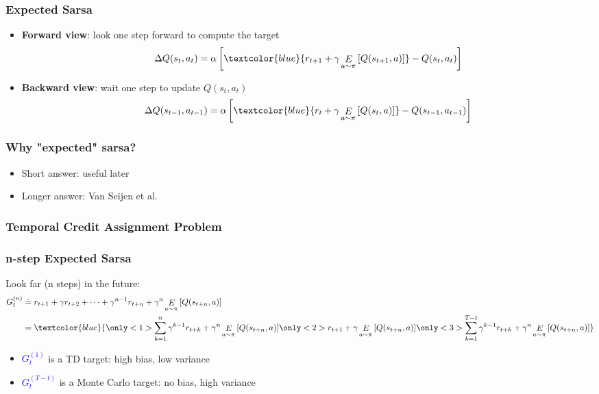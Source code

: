 \documentclass{beamer}
\newcommand{\expect}[2]{\mathop{E}_{#1}\left[#2\right]}
\begin{document}
\begin{frame}
\frametitle{Expected Sarsa}
\begin{itemize}
\item<1-> \textbf{Forward view}: look one step forward to compute the target
\[
	\Delta Q(s_t,a_t) = \alpha\left[\textcolor{blue}{r_{t+1} + \gamma\expect{a\sim\pi}{Q(s_{t+1},a)}} - Q(s_t,a_t)\right]
\]
\item<2> \textbf{Backward view}: wait one step to update $Q(s_t,a_t)$
\begin{align*}
	\Delta Q(s_{t-1},a_{t-1}) = \alpha\left[
	\textcolor{blue}{r_t + \gamma\expect{a\sim\pi}{Q(s_t,a)}} - Q(s_{t-1},a_{t-1})\right] 
\end{align*}
\end{itemize}
\end{frame}

\begin{frame}
\frametitle{Why "expected" sarsa?}
\begin{itemize}
\item Short answer: useful later
\item Longer answer: Van Seijen et al. \cite{van2009theoretical}
\end{itemize}
\end{frame}

\begin{frame}
\frametitle{Temporal Credit Assignment Problem}
\end{frame}

\begin{frame}
\frametitle{n-step Expected Sarsa}
Look far (n steps) in the future:
\begin{align*}
	G_t^{(n)} &\doteq r_{t+1} + \gamma r_{t+2} + \dots + \gamma^{n-1}r_{t+n}
		+ \gamma^n\expect{a\sim\pi}{Q(s_{t+n},a)} \\
		& = \textcolor{blue}{
		\only<1>{
		\sum_{k=1}^{n}\gamma^{k-1}r_{t+k} + \gamma^n\expect{a\sim\pi}{Q(s_{t+n},a)}
		}\only<2>{
		r_{t+1}+\gamma\expect{a\sim\pi}{Q(s_{t+n},a)}
		}\only<3>{
		\sum_{k=1}^{T-t}\gamma^{k-1}r_{t+k} + \gamma^n\expect{a\sim\pi}{Q(s_{t+n},a)}}
		}
\end{align*}
\begin{itemize}
\item<2,4> \textcolor{blue}{$G_t^{(1)}$} is a TD target: high bias, low variance
\item<3-> \textcolor{blue}{$G_t^{(T-t)}$} is a Monte Carlo target: no bias, high variance
\end{itemize}
\end{frame}
\end{document}
